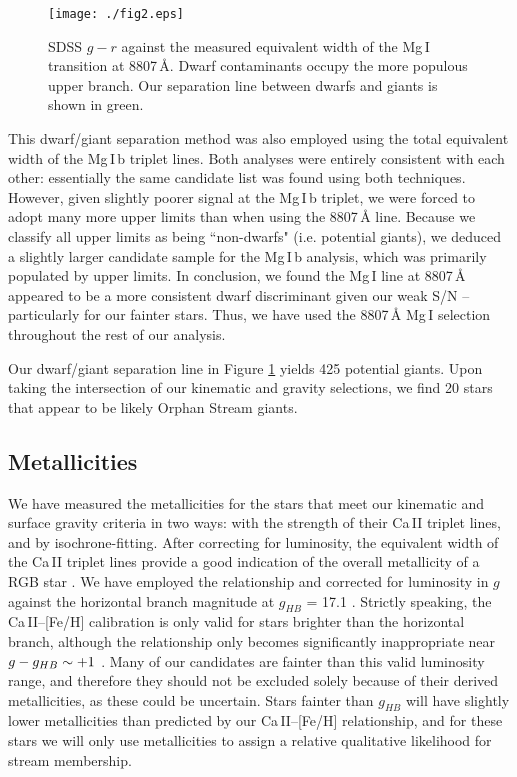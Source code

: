\documentclass[10pt,apjl]{emulateapj}
\begin{document}
\begin{figure}[h]
	\texttt{[image: ./fig2.eps]}
	\caption{SDSS $g - r$ against the measured equivalent width of the Mg\,\textsc{I} transition at 8807\,\AA{}. Dwarf contaminants occupy the more populous upper branch. Our separation line between dwarfs and giants is shown in green.}
	\label{fig:ew-mg}
\end{figure}

This dwarf/giant separation method was also employed using the total equivalent width of the Mg\,\textsc{I}\,b triplet lines. Both analyses were entirely consistent with each other: essentially the same candidate list was found using both techniques. However, given slightly poorer signal at the Mg\,\textsc{I}\,b triplet, we were forced to adopt many more upper limits than when using the 8807\,{\AA} line. Because we classify all upper limits as being ``non-dwarfs" (i.e. potential giants), we deduced a slightly larger candidate sample for the Mg\,\textsc{I}\,b analysis, which was primarily populated by upper limits. In conclusion, we found the Mg\,\textsc{I} line at 8807\,{\AA} appeared to be a more consistent dwarf discriminant given our weak S/N \--- particularly for our fainter stars. Thus, we have used the 8807\,{\AA} Mg\,\textsc{I} selection throughout the rest of our analysis.

Our dwarf/giant separation line in Figure \ref{fig:ew-mg} yields 425 potential giants. Upon taking the intersection of our kinematic and gravity selections, we find 20 stars that appear to be likely Orphan Stream giants.


\subsection{Metallicities}
\label{sec:metallicities}

We have measured the metallicities for the stars that meet our kinematic and surface gravity criteria in two ways: with the strength of their Ca\,\textsc{II} triplet lines, and by isochrone-fitting. After correcting for luminosity, the equivalent width of the Ca\,\textsc{II} triplet lines provide a good indication of the overall metallicity of a RGB star \citep{Amandroff_Da_Costa_1991}. We have employed the \citet{Starkenburg_et-al_2010} relationship and corrected for luminosity in $g$ against the horizontal branch magnitude at $g_{HB}$ = 17.1 \citep{Newberg_et-al_2010}. Strictly speaking, the Ca\,\textsc{II}\---[Fe/H] calibration is only valid for stars brighter than the horizontal branch, although the relationship only becomes significantly inappropriate near $g \-- g_{HB} \sim +1$ \citep{Saviane_et-al_2012}. Many of our candidates are fainter than this valid luminosity range, and therefore they should not be excluded solely because of their derived metallicities, as these could be uncertain. Stars fainter than $g_{HB}$ will have slightly lower metallicities than predicted by our Ca\,\textsc{II}\---[Fe/H] relationship, and for these stars we will only use metallicities to assign a relative qualitative likelihood for stream membership.
\end{document}
